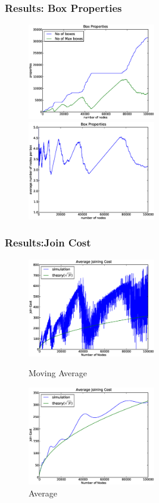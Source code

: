\documentclass[red]{beamer}
\begin{document}
\begin{frame}
\frametitle{Results: Box Properties}
\begin{figure}
\begin{minipage}{5cm}
\centering
\includegraphics[width=2.2in]{figs/box_property.eps}
\end{minipage}
\begin{minipage}{5cm}
\centering
\includegraphics[width=2.2in]{figs/ave_no_node_box.eps}
\end{minipage}
\end{figure}
\end{frame}

\begin{frame}
\frametitle{Results:Join Cost}
\begin{figure}
\begin{minipage}{5cm}
\centering
\includegraphics[width=2.2in]{figs/join_cost_100k_10step.eps}
\caption{Moving Average} 
\end{minipage}
\begin{minipage}{5cm}
\centering
\includegraphics[width=2.2in]{figs/join_cost_100k.eps}
\caption{Average}
\end{minipage}
\end{figure}
\end{frame}
\end{document}
